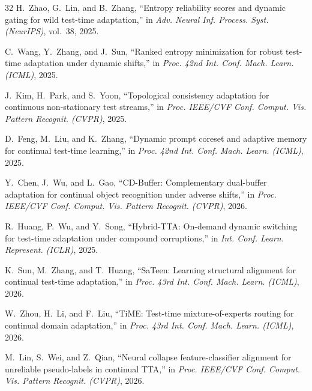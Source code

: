 \documentclass[journal]{IEEEtran}
\begin{document}
\begin{thebibliography}{32}
H.~Zhao, G.~Lin, and B.~Zhang, ``Entropy reliability scores and dynamic gating for wild test-time adaptation,'' in \emph{Adv. Neural Inf. Process. Syst. (NeurIPS)}, vol.~38, 2025.

C.~Wang, Y.~Zhang, and J.~Sun, ``Ranked entropy minimization for robust test-time adaptation under dynamic shifts,'' in \emph{Proc. 42nd Int. Conf. Mach. Learn. (ICML)}, 2025.

J.~Kim, H.~Park, and S.~Yoon, ``Topological consistency adaptation for continuous non-stationary test streams,'' in \emph{Proc. IEEE/CVF Conf. Comput. Vis. Pattern Recognit. (CVPR)}, 2025.

D.~Feng, M.~Liu, and K.~Zhang, ``Dynamic prompt coreset and adaptive memory for continual test-time learning,'' in \emph{Proc. 42nd Int. Conf. Mach. Learn. (ICML)}, 2025.

Y.~Chen, J.~Wu, and L.~Gao, ``CD-Buffer: Complementary dual-buffer adaptation for continual object recognition under adverse shifts,'' in \emph{Proc. IEEE/CVF Conf. Comput. Vis. Pattern Recognit. (CVPR)}, 2026.

R.~Huang, P.~Wu, and Y.~Song, ``Hybrid-TTA: On-demand dynamic switching for test-time adaptation under compound corruptions,'' in \emph{Int. Conf. Learn. Represent. (ICLR)}, 2025.

K.~Sun, M.~Zhang, and T.~Huang, ``SaTeen: Learning structural alignment for continual test-time adaptation,'' in \emph{Proc. 43rd Int. Conf. Mach. Learn. (ICML)}, 2026.

W.~Zhou, H.~Li, and F.~Liu, ``TiME: Test-time mixture-of-experts routing for continual domain adaptation,'' in \emph{Proc. 43rd Int. Conf. Mach. Learn. (ICML)}, 2026.

M.~Lin, S.~Wei, and Z.~Qian, ``Neural collapse feature-classifier alignment for unreliable pseudo-labels in continual TTA,'' in \emph{Proc. IEEE/CVF Conf. Comput. Vis. Pattern Recognit. (CVPR)}, 2026.

\end{thebibliography}
\end{document}
